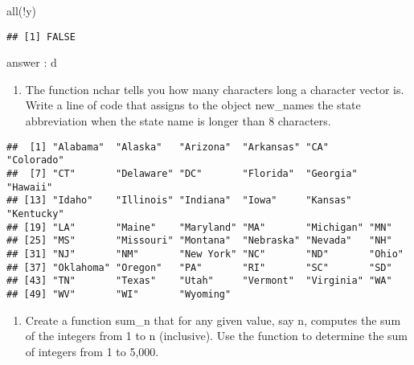 \documentclass[
]{article}
\newenvironment{Shaded}{\begin{snugshade}}{\end{snugshade}}
\newcommand{\DecValTok}[1]{\textcolor[rgb]{0.00,0.00,0.81}{#1}}
\newcommand{\FunctionTok}[1]{\textcolor[rgb]{0.00,0.00,0.00}{#1}}
\newcommand{\NormalTok}[1]{#1}
\newcommand{\OtherTok}[1]{\textcolor[rgb]{0.56,0.35,0.01}{#1}}
\newcommand{\SpecialCharTok}[1]{\textcolor[rgb]{0.00,0.00,0.00}{#1}}
\providecommand{\tightlist}{%
  \setlength{\itemsep}{0pt}\setlength{\parskip}{0pt}}
\begin{document}
\begin{Shaded}
\begin{Highlighting}[]
\FunctionTok{all}\NormalTok{(}\SpecialCharTok{!}\NormalTok{y)}
\end{Highlighting}
\end{Shaded}

\begin{verbatim}
## [1] FALSE
\end{verbatim}

answer : d

\begin{enumerate}
\def\labelenumi{\arabic{enumi}.}
\setcounter{enumi}{2}
\tightlist
\item
  The function nchar tells you how many characters long a character
  vector is. Write a line of code that assigns to the object new\_names
  the state abbreviation when the state name is longer than 8
  characters.
\end{enumerate}

\begin{Shaded}
\end{Shaded}

\begin{verbatim}
##  [1] "Alabama"  "Alaska"   "Arizona"  "Arkansas" "CA"       "Colorado"
##  [7] "CT"       "Delaware" "DC"       "Florida"  "Georgia"  "Hawaii"  
## [13] "Idaho"    "Illinois" "Indiana"  "Iowa"     "Kansas"   "Kentucky"
## [19] "LA"       "Maine"    "Maryland" "MA"       "Michigan" "MN"      
## [25] "MS"       "Missouri" "Montana"  "Nebraska" "Nevada"   "NH"      
## [31] "NJ"       "NM"       "New York" "NC"       "ND"       "Ohio"    
## [37] "Oklahoma" "Oregon"   "PA"       "RI"       "SC"       "SD"      
## [43] "TN"       "Texas"    "Utah"     "Vermont"  "Virginia" "WA"      
## [49] "WV"       "WI"       "Wyoming"
\end{verbatim}

\begin{enumerate}
\def\labelenumi{\arabic{enumi}.}
\setcounter{enumi}{3}
\tightlist
\item
  Create a function sum\_n that for any given value, say n, computes the
  sum of the integers from 1 to n (inclusive). Use the function to
  determine the sum of integers from 1 to 5,000.
\end{enumerate}
\end{document}
